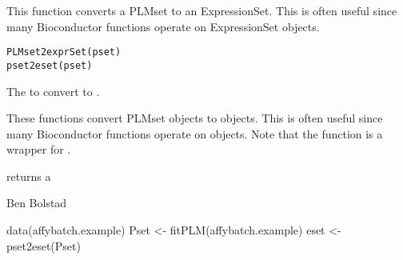 \begin{Description}\relax
This function converts a PLMset to an ExpressionSet. This is often useful
since many Bioconductor functions operate on ExpressionSet objects.
\end{Description}
\begin{Usage}
\begin{verbatim}
PLMset2exprSet(pset)
pset2eset(pset)
\end{verbatim}
\end{Usage}
\begin{Arguments}
\begin{ldescription}
\item[\code{pset}] The  to convert to .
\end{ldescription}
\end{Arguments}
\begin{Details}\relax
These functions convert PLMset objects to  objects.
This is often useful since many Bioconductor functions operate on
 objects. Note that the function 
is a wrapper for .
\end{Details}
\begin{Value}
returns a 
\end{Value}
\begin{Author}\relax
Ben Bolstad 
\end{Author}
\begin{SeeAlso}\relax
{}
\end{SeeAlso}
\begin{Examples}
\begin{ExampleCode}
data(affybatch.example)
Pset <- fitPLM(affybatch.example)
eset <- pset2eset(Pset)
\end{ExampleCode}
\end{Examples}

